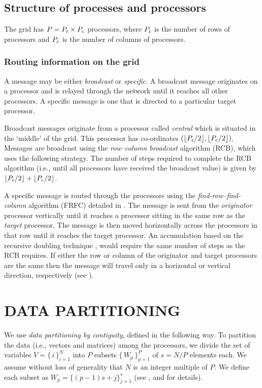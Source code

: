 \documentclass{ecai2014}
\begin{document}
\subsection{Structure of processes and processors}
\label{procstruct}
The grid has $P=P_{\rm{r}}\times P_{\rm{c}}$ processors, where
$P_{\rm{r}}$ is the number of rows of processors and $P_{\rm{c}}$ is
the number of columns of processors.

\subsubsection{Routing information on the grid}
\label{routing} A message may be either \emph{broadcast} or {\em
  specific}. A broadcast message originates on a processor and is
relayed through the network until it reaches all other processors. A
specific message is one that is directed to a particular target
processor.

Broadcast messages originate from a processor called \emph{central}
which is situated in the `middle' of the grid. This processor has
co-ordinates $(\lfloor P_{\rm{r}}/2 \rfloor,\lfloor P_{\rm{c}}/2
\rfloor)$.  Messages are broadcast using the \emph{row--column
  broadcast} algorithm (RCB), which uses the following strategy.  The
number of steps required to complete the RCB algorithm (i.e., until
all processors have received the broadcast value) is given by $\lfloor
P_{\rm{r}}/2\rfloor+\lfloor P_{\rm{c}}/2\rfloor$.

A specific message is routed through the processors using the
\emph{find-row--find-column} algorithm (FRFC) detailed in
\cite{kn:deCarlini91}.  The message is sent from the \emph{originator}
processor vertically until it reaches a processor sitting in the same
row as the \emph{target} processor. The message is then moved
horizontally across the processors in that row until it reaches the
target processor. An accumulation based on the recursive doubling
technique \cite[pp. 56--61]{kn:Modi88}, would require the same number
of steps as the RCB requires. If either the row or column of the
originator and target processors are the same then the message will
travel only in a horizontal or vertical direction, respectively (see
\cite{kn:Smith85}).

\section{DATA PARTITIONING}
\label{datapart}
We use \emph{data partitioning by contiguity}, defined in the
following way. To partition the data (i.e., vectors and matrices)
among the processors, we divide the set of variables
\mbox{$V=\{\,i\,\}_{i=1}^{N}$} into $P$ subsets
$\{\,W_{p}\,\}_{p=1}^{P}$ of $s=N/P$ elements each. We assume without
loss of generality that $N$ is an integer multiple of $P$. We define
each subset as $W_{p}=\{(p-1)s+j\}_{j=1}^{s}$ (see
\cite{kn:Schofield89}, \cite{kn:daCunha92a} and \cite{kn:Atkin} for
details).
\end{document}
